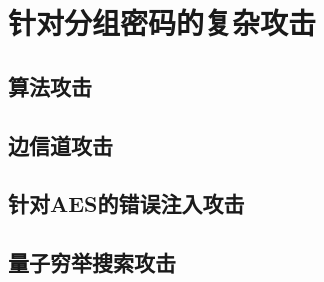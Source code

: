 \section{针对分组密码的复杂攻击}

\subsection{算法攻击}

\subsection{边信道攻击}\label{subsec:4-3-2}

\subsection{针对AES的错误注入攻击}

\subsection{量子穷举搜索攻击}